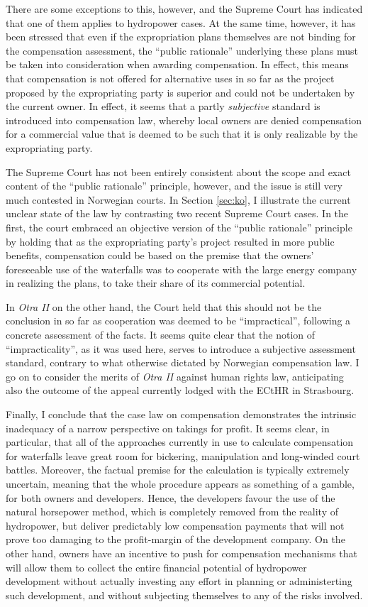 There are some exceptions to this, however, and the Supreme Court has indicated that one of them applies to hydropower cases. At the same time, however, it has been stressed that even if the expropriation plans themselves are not binding for the compensation assessment, the ``public rationale'' underlying these plans must be taken into consideration when awarding compensation. In effect, this means that compensation is not offered for alternative uses in so far as the project proposed by the expropriating party is superior and could not be undertaken by the current owner. In effect, it seems that a partly {\it subjective} standard is introduced into compensation law, whereby local owners are denied compensation for a commercial value that is deemed to be such that it is only realizable by the expropriating party.

The Supreme Court has not been entirely consistent about the scope and exact content of the ``public rationale'' principle, however,   and the issue is still very much contested in Norwegian courts. In Section \ref{sec:ko}, I illustrate the current unclear state of the law by contrasting two recent Supreme Court cases. In the first, the court embraced an objective version of the ``public rationale'' principle by holding that as the expropriating party's project resulted in more public benefits, compensation could be based on the premise that the owners' foreseeable use of the waterfalls was to cooperate with the large energy company in realizing the plans, to take their share of its commercial potential. 

In {\it Otra II} on the other hand, the Court held that this should not be the conclusion in so far as cooperation was deemed to be ``impractical'', following a concrete assessment of the facts. It seems quite clear that the notion of ``impracticality'', as it was used here, serves to introduce a subjective assessment standard, contrary to what otherwise dictated by Norwegian compensation law. 
I go on to consider the merits of {\it Otra II} against human rights law, anticipating also the outcome of the appeal currently lodged with the ECtHR in Strasbourg.

Finally, I conclude that the case law on compensation demonstrates the intrinsic inadequacy of a narrow perspective on takings for profit. It seems clear, in particular, that all of the approaches currently in use to calculate compensation for waterfalls leave great room for bickering, manipulation and long-winded court battles. Moreover, the factual premise for the calculation is typically extremely uncertain, meaning that the whole procedure appears as something of a gamble, for both owners and developers. Hence, the developers favour the use of the natural horsepower method, which is completely removed from the reality of hydropower, but deliver predictably low compensation payments that will not prove too damaging to the profit-margin of the development company. On the other hand, owners have an incentive to push for compensation mechanisms that will allow them to collect the entire financial potential of hydropower development without actually investing any effort in planning or administerting such development, and without subjecting themselves to any of the risks involved. 

